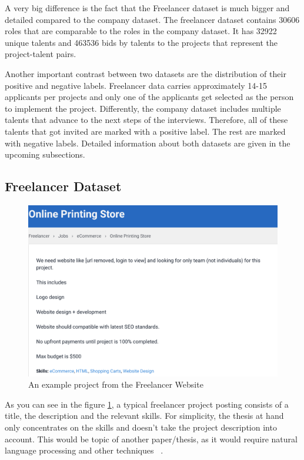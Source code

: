 A very big difference is the fact that the Freelancer dataset is much bigger and detailed compared to the company dataset. The freelancer dataset contains 30606 roles that are comparable to the roles in the company dataset. It has 32922 unique talents and 463536 bids by talents to the projects that represent the project-talent pairs.


Another important contrast between two datasets are the distribution of their positive and negative labels. Freelancer data carries approximately 14-15 applicants per projects and only one of the applicants get selected as the person to implement the project. Differently,  the company dataset includes multiple talents that advance to the next steps of the interviews. Therefore, all of these talents that got invited are marked with a positive label. The rest are marked with negative labels. Detailed information about both datasets are given in the upcoming subsections.

\subsection{Freelancer Dataset}


\begin{figure}[!ht]
	\centering
	\includegraphics[width=\textwidth]{figures/FreelancerExample.png}
	\caption{An example project from the Freelancer Website}
	\label{fig:freelancer-example-project}
\end{figure}


As you can see in the figure \ref{fig:freelancer-example-project}, a typical freelancer project posting consists of a title, the description and the relevant skills. For simplicity, the thesis at hand only concentrates on the skills and doesn't take the project description into account. This would be topic of another paper/thesis, as it would require natural language processing and other techniques ~\parencite{bird2009natural}.


